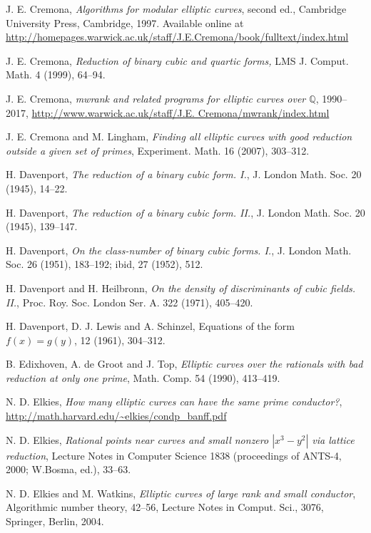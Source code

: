 \begin{thebibliography}{}
J. E. Cremona,
\emph{Algorithms for modular elliptic curves}, second ed.,
Cambridge University Press, Cambridge, 1997. Available online at 
\url{http://homepages.warwick.ac.uk/staff/J.E.Cremona/book/fulltext/index.html}

J. E. Cremona,
\emph{Reduction of binary cubic and quartic forms,}
LMS J. Comput. Math. 4 (1999), 64--94.

J. E. Cremona, 
\emph{mwrank and related programs for elliptic curves over $\mathbb{Q}$}, 1990--2017,
 \url{http://www.warwick.ac.uk/staff/J.E. Cremona/mwrank/index.html}
  
J. E. Cremona and M. Lingham,
\emph{Finding all elliptic curves with good reduction outside a given set of primes},
Experiment. Math. 16 (2007), 303--312.

H. Davenport,
\emph{The reduction of a binary cubic form. I.},
J. London Math. Soc. 20 (1945), 14--22.

H. Davenport,
\emph{The reduction of a binary cubic form. II.},
J. London Math. Soc. 20 (1945), 139--147.

H. Davenport,
\emph{On the class-number of binary cubic forms. I.},
J. London Math. Soc. 26 (1951), 183--192; ibid,  27 (1952), 512.

H. Davenport and H. Heilbronn,
\emph{On the density of discriminants of cubic fields. II.},
Proc. Roy. Soc. London Ser. A. 322 (1971), 405--420.

H. Davenport, D. J. Lewis and A. Schinzel,
\newblock Equations of the form $f(x)=g(y)$,
 12 (1961), 304--312.

B. Edixhoven, A. de Groot and J. Top,
\emph{Elliptic curves over the rationals with bad reduction at only one prime},
Math. Comp.  54 (1990), 413--419.

N. D. Elkies,
\emph{How many elliptic curves can have the same prime conductor?}, 
\url{http://math.harvard.edu/~elkies/condp_banff.pdf}

N. D. Elkies,
\emph{Rational points near curves and small nonzero $|x^3-y^2|$ via lattice reduction}, 
Lecture Notes in Computer Science 1838 (proceedings of ANTS-4, 2000; W.Bosma, ed.), 33--63.

N. D. Elkies and M. Watkins,
\emph{Elliptic curves of large rank and small conductor},
 Algorithmic number theory, 42--56, Lecture Notes in Comput. Sci., 3076, Springer, Berlin, 2004.


\end{thebibliography}
